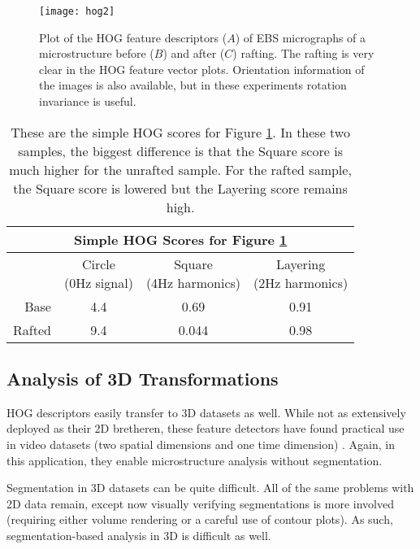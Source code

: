 \documentclass[review]{elsarticle}
\begin{document}
	
	\begin{figure}[!ht]
  		\centering
    	\texttt{[image: hog2]}
  		\caption{ Plot of the HOG feature descriptors ($A$) of EBS micrographs of a microstructure before ($B$) and after ($C$) rafting. The rafting is very clear in the HOG feature vector plots. Orientation information of the images is also available, but in these experiments rotation invariance is useful. }
  		\label{figure3}
	\end{figure}
	
	\begin{table}[h]
		\begin{center}
			\begin{tabular}{ r | c | c | c }
				\multicolumn{4}{c}{Simple HOG Scores for Figure \ref{figure3}} \\
				\hline
				& \shortstack{Circle \\ (0Hz signal)} & \shortstack{Square \\ (4Hz harmonics)} & \shortstack{Layering \\ (2Hz harmonics)} \\
				\hline
				Base & 4.4 & 0.69 & 0.91 \\
				Rafted & 9.4 & 0.044 & 0.98 \\
				\hline
			\end{tabular}
			
	  		\caption{ These are the simple HOG scores for Figure \ref{figure3}. In these two samples, the biggest difference is that the Square score is much higher for the unrafted sample. For the rafted sample, the Square score is lowered but the Layering score remains high. }
	  		\label{table2}
		\end{center}
  	\end{table}
	
	\subsection{Analysis of 3D Transformations}
	HOG descriptors easily transfer to 3D datasets as well. While not as extensively deployed as their 2D bretheren, these feature detectors have found practical use in video datasets (two spatial dimensions and one time dimension) \cite{hog3d1}. Again, in this application, they enable microstructure analysis without segmentation.

	Segmentation in 3D datasets can be quite difficult. All of the same problems with 2D data remain, except now visually verifying segmentations is more involved (requiring either volume rendering or a careful use of contour plots). As such, segmentation-based analysis in 3D is difficult as well.
\end{document}
